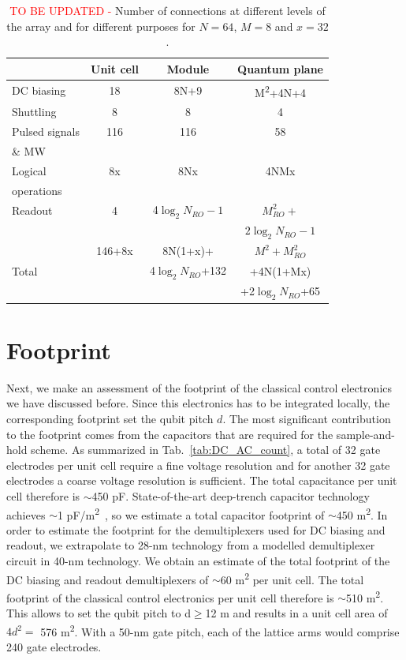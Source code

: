 \documentclass[aps,prl,reprint,superscriptaddress,floatfix]{revtex4-1}
\begin{document}
\begin{table}[t]
    \centering
    \begin{tabular}{l|c|c|c}
         & Unit cell & Module & Quantum plane \\
        \hline \hline
        DC biasing & 18 & 8N+9 & M\textsuperscript{2}+4N+4 \\
        \hline
        Shuttling & 8 & 8 & 4 \\
        \hline
        Pulsed signals & 116 & 116 & 58 \\
        \& MW & & & \\
        \hline
        Logical & 8x & 8Nx & 4NMx \\
        operations & & & \\
        \hline
        Readout & 4 & 4$\log_2 N_{RO}-1$ & $M_{RO}^{2}+$ \\
        & & & $2\log_2 N_{RO}-1$ \\
        \hline \hline
        & 146+8x & 8N(1+x)+ & $M^{2} + M_{RO}^{2}$ \\
        Total & & 4$\log_2 N_{RO}$+132 & +4N(1+Mx) \\
        & & & +2$\log_2 N_{RO}$+65
    \end{tabular}
    \caption{\textcolor{red}{TO BE UPDATED - }Number of connections at different levels of the array and for different purposes for $N=64$, $M=8$ and $x=32$.}
    \label{tab:wire_count_example}
\end{table}

\section{Footprint}
\label{sec:footprint}
Next, we make an assessment of the footprint of the classical control electronics we have discussed before.
Since this electronics has to be integrated locally, the corresponding footprint set the qubit pitch $d$.
The most significant contribution to the footprint comes from the capacitors that are required for the sample-and-hold scheme.
As summarized in Tab.~\ref{tab:DC_AC_count}, a total of 32 gate electrodes per unit cell require a fine voltage resolution and for another 32 gate electrodes a coarse voltage resolution is sufficient.
The total capacitance per unit cell therefore is $\sim$450 pF.
State-of-the-art deep-trench capacitor technology achieves $\sim$1 pF/\textmu m\textsuperscript{2}~\cite{Park2015}, so we estimate a total capacitor footprint of $\sim$450 \textmu m\textsuperscript{2}.
In order to estimate the footprint for the demultiplexers used for DC biasing and readout, we extrapolate to 28-nm technology from a modelled demultiplexer circuit in 40-nm technology.
We obtain an estimate of the total footprint of the DC biasing and readout demultiplexers of $\sim$60 \textmu m\textsuperscript{2} per unit cell.
The total footprint of the classical control electronics per unit cell therefore is $\sim$510 \textmu m\textsuperscript{2}.
This allows to set the qubit pitch to d$\geq$12 \textmu m and results in a unit cell area of $4d^2=$ 576 \textmu m\textsuperscript{2}.
With a 50-nm gate pitch, each of the lattice arms would comprise 240 gate electrodes.
\end{document}
